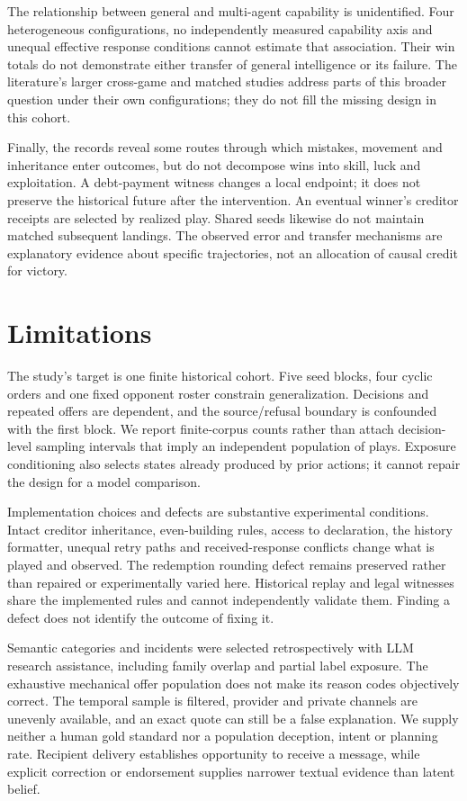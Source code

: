 The relationship between general and multi-agent capability is unidentified. Four heterogeneous configurations, no independently measured capability axis and unequal effective response conditions cannot estimate that association. Their win totals do not demonstrate either transfer of general intelligence or its failure. The literature's larger cross-game and matched studies address parts of this broader question under their own configurations; they do not fill the missing design in this cohort.

Finally, the records reveal some routes through which mistakes, movement and inheritance enter outcomes, but do not decompose wins into skill, luck and exploitation. A debt-payment witness changes a local endpoint; it does not preserve the historical future after the intervention. An eventual winner's creditor receipts are selected by realized play. Shared seeds likewise do not maintain matched subsequent landings. The observed error and transfer mechanisms are explanatory evidence about specific trajectories, not an allocation of causal credit for victory.

\section{Limitations}

The study's target is one finite historical cohort. Five seed blocks, four cyclic orders and one fixed opponent roster constrain generalization. Decisions and repeated offers are dependent, and the source/refusal boundary is confounded with the first block. We report finite-corpus counts rather than attach decision-level sampling intervals that imply an independent population of plays. Exposure conditioning also selects states already produced by prior actions; it cannot repair the design for a model comparison.

Implementation choices and defects are substantive experimental conditions. Intact creditor inheritance, even-building rules, access to declaration, the history formatter, unequal retry paths and received-response conflicts change what is played and observed. The redemption rounding defect remains preserved rather than repaired or experimentally varied here. Historical replay and legal witnesses share the implemented rules and cannot independently validate them. Finding a defect does not identify the outcome of fixing it.

Semantic categories and incidents were selected retrospectively with LLM research assistance, including family overlap and partial label exposure. The exhaustive mechanical offer population does not make its reason codes objectively correct. The temporal sample is filtered, provider and private channels are unevenly available, and an exact quote can still be a false explanation. We supply neither a human gold standard nor a population deception, intent or planning rate. Recipient delivery establishes opportunity to receive a message, while explicit correction or endorsement supplies narrower textual evidence than latent belief.

